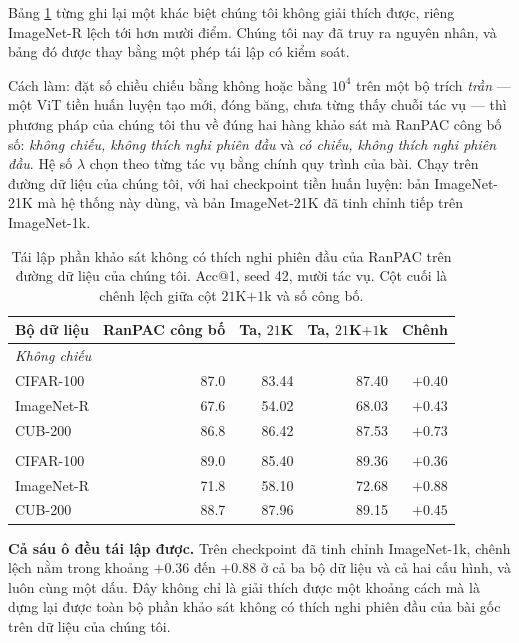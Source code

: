 \documentclass[11pt,a4paper]{article}
\begin{document}
Bảng \ref{tab:nophase1} từng ghi lại một khác biệt chúng tôi không giải thích
được, riêng ImageNet-R lệch tới hơn mười điểm. Chúng tôi nay đã truy ra nguyên
nhân, và bảng đó được thay bằng một phép tái lập có kiểm soát.

Cách làm: đặt số chiều chiếu bằng không hoặc bằng $10^4$ trên một bộ trích
\emph{trần} --- một ViT tiền huấn luyện tạo mới, đóng băng, chưa từng thấy chuỗi
tác vụ --- thì phương pháp của chúng tôi thu về đúng hai hàng khảo sát mà RanPAC
công bố số: \emph{không chiếu, không thích nghi phiên đầu} và \emph{có chiếu,
không thích nghi phiên đầu}. Hệ số $\lambda$ chọn theo từng tác vụ bằng chính quy
trình của bài. Chạy trên đường dữ liệu của chúng tôi, với hai checkpoint tiền
huấn luyện: bản ImageNet-21K mà hệ thống này dùng, và bản ImageNet-21K đã tinh
chỉnh tiếp trên ImageNet-1k.

\begin{table}[htbp]
\centering
\caption{Tái lập phần khảo sát không có thích nghi phiên đầu của RanPAC trên
đường dữ liệu của chúng tôi. Acc@1, seed 42, mười tác vụ. Cột cuối là chênh lệch
giữa cột $21$K$+1$k và số công bố.}
\label{tab:nophase1}
\begin{tabular}{@{}lrrrr@{}}
\toprule
Bộ dữ liệu & RanPAC công bố & Ta, $21$K & Ta, $21$K$+1$k & Chênh \\
\midrule
\multicolumn{5}{l}{\emph{Không chiếu}}\\
CIFAR-100  & 87.0 & 83.44 & 87.40 & $+0.40$ \\
ImageNet-R & 67.6 & 54.02 & 68.03 & $+0.43$ \\
CUB-200    & 86.8 & 86.42 & 87.53 & $+0.73$ \\
\addlinespace
\multicolumn{5}{l}{\emph{Có chiếu, $M = 10^4$}}\\
CIFAR-100  & 89.0 & 85.40 & 89.36 & $+0.36$ \\
ImageNet-R & 71.8 & 58.10 & 72.68 & $+0.88$ \\
CUB-200    & 88.7 & 87.96 & 89.15 & $+0.45$ \\
\bottomrule
\end{tabular}
\end{table}

\textbf{Cả sáu ô đều tái lập được.} Trên checkpoint đã tinh chỉnh ImageNet-1k,
chênh lệch nằm trong khoảng $+0.36$ đến $+0.88$ ở cả ba bộ dữ liệu và cả hai cấu
hình, và luôn cùng một dấu. Đây không chỉ là giải thích được một khoảng cách mà
là dựng lại được toàn bộ phần khảo sát không có thích nghi phiên đầu của bài gốc
trên dữ liệu của chúng tôi.
\end{document}
